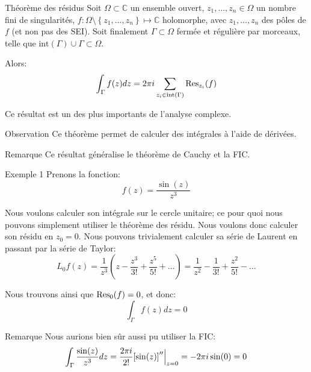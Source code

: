\documentclass[a4paper]{article}
\begin{document}
\begin{parag}{Théorème des résidus}
    Soit $\Omega \subset \mathbb{C}$ un ensemble ouvert, $z_1, \ldots, z_n \in \Omega$ un nombre fini de singularités, $f: \Omega \setminus \left\{z_1, \ldots, z_n\right\} \mapsto \mathbb{C}$ holomorphe, avec $z_1, \ldots, z_n$ des pôles de $f$ (et non pas des SEI). Soit finalement $\Gamma \subset \Omega$ fermée et régulière par morceaux, telle que $\text{int}\left(\Gamma\right) \cup \Gamma \subset \Omega$.

    Alors: 
    \[\int_{\Gamma} f\left(z\right)dz = 2\pi i \sum_{z_i \in \text{int}\left(\Gamma\right)}^{} \Res_{z_i}\left(f\right)\]

    Ce résultat est un des plus importants de l'analyse complexe.

    \begin{subparag}{Observation}
        Ce théorème permet de calculer des intégrales à l'aide de dérivées.
    \end{subparag}

    \begin{subparag}{Remarque}
        Ce résultat généralise le théorème de Cauchy et la FIC.
    \end{subparag}
\end{parag}

\begin{parag}{Exemple 1}
    Prenons la fonction: 
    \[f\left(z\right) = \frac{\sin\left(z\right)}{z^3}\]
    
    Nous voulons calculer son intégrale sur le cercle unitaire; ce pour quoi nous pouvons simplement utiliser le théorème des résidu. Nous voulons donc calculer son résidu en $z_0 = 0$. Nous pouvons trivialement calculer sa série de Laurent en passant par la série de Taylor: 
    \[L_0 f \left(z\right) = \frac{1}{z^3} \left(z- \frac{z^3}{3!} + \frac{z^5}{5!} + \ldots\right) = \frac{1}{z^2} - \frac{1}{3!} + \frac{z^2}{5!} - \ldots\]
    
    Nous trouvons ainsi que $\Res_0\left(f\right) = 0$, et donc: 
    \[\int_{\Gamma} f\left(z\right)dz = 0\]

    \begin{subparag}{Remarque}
        Nous aurions bien sûr aussi pu utiliser la FIC: 
        \[\int_{\Gamma} \frac{\sin\left(z\right)}{z^3} dz = \frac{2\pi i}{2!} \left[\sin\left(z\right)\right]'' \eval_{z=0}^{} = -2\pi i \sin\left(0\right) = 0\]
    \end{subparag}
\end{parag}
\end{document}
